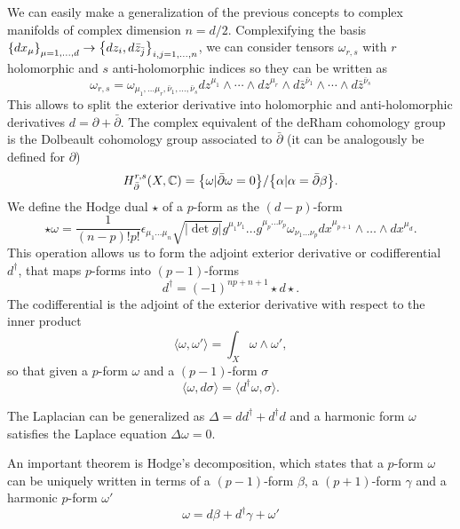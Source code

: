 We can easily make a generalization of the previous concepts to complex manifolds of complex dimension $n=d/2$.
Complexifying the basis $\qty{dx_{\mu}}_{\mu=1,\ldots,d} \to  \qty{dz_i,d\bar z_{\bar j}}_{i,j=1,\ldots,n}$,
we can consider tensors $\omega_{r,s}$ with $r$ holomorphic and $s$ anti-holomorphic indices so they can be written as 
\begin{equation}
  \omega_{r,s} = \omega_{\mu_1,\ldots\mu_r,\bar \nu_1,\ldots,\bar \nu_s} dz^{\mu_1}\wedge\cdots\wedge dz^{\mu_r}\wedge d\bar z^{\bar \nu_1}\wedge
  \cdots\wedge d\bar z^{\bar \nu_s}
\end{equation}
This allows to split the exterior derivative into holomorphic and anti-holomorphic derivatives $d=\partial+\bar\partial$. 
The complex equivalent of the deRham cohomology group is the Dolbeault cohomology group associated to $\bar \partial$ (it can be analogously be defined for $\partial$)
\begin{equation}
  H^{r,s}_{\bar \partial }(X,\mathbb C)=\qty {\omega | \bar \partial \omega= 0}/\qty{\alpha|\alpha=\bar\partial \beta}.
\end{equation}
We define the Hodge dual $\star$ of a $p$-form as the $(d-p)$-form
\begin{equation}
  \star \omega = \frac{1}{(n-p)!p!}\epsilon_{\mu_1\ldots\mu_n}\sqrt{|\det g|} g^{\mu_1 \nu_1}\ldots g^{\mu_p\ldots\nu_p}\omega_{\nu_1\ldots\nu_p}dx^{\mu_{p+1}}\wedge \ldots\wedge dx^{\mu_d}.
\end{equation}
This operation allows us to form the adjoint exterior derivative or codifferential $d^\dagger$, 
that maps $p$-forms into $(p-1)$-forms
\begin{equation}
  d^\dagger=(-1)^{np+n+1}\star d \star. 
\end{equation}
The codifferential is the adjoint of the exterior derivative with respect to the inner product
\begin{equation}
  \langle \omega,\omega'\rangle = \int_X \omega\wedge\omega',
\end{equation}
so that given a $p$-form $\omega$ and a $(p-1)$-form $\sigma$
\begin{equation}
  \langle \omega, d\sigma \rangle = \langle d^\dagger \omega, \sigma\rangle.
\end{equation}

The Laplacian can be generalized as $\Delta = dd^\dagger+d^\dagger d$ and
a harmonic form $\omega$ satisfies the Laplace equation $\Delta \omega=0$.

An important theorem is Hodge's decomposition, which states 
that a  $p$-form $\omega$ can be uniquely written in terms of a $(p-1)$-form $\beta$, 
a $(p+1)$-form $\gamma$ and a harmonic $p$-form $\omega'$
\begin{equation}
  \omega = d\beta + d^\dagger \gamma +\omega'
\end{equation}

